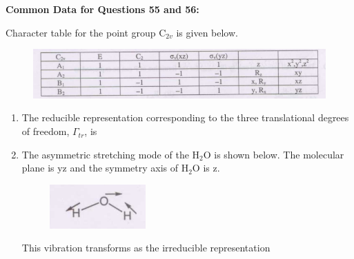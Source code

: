\documentclass[journal,12pt,onecolumn]{IEEEtran}
\theoremstyle{remark}
\begin{document}
\textbf{Common Data for Questions 55 and 56:}

Character table for the point group C$_{2v}$ is given below.
 \begin{figure}[H]
    \centering
    \includegraphics[width=0.8\columnwidth]{q55}
    \caption*{}
    \label{fig:q55}
\end{figure}

\begin{enumerate}[resume]
\item The reducible representation corresponding to the three translational degrees of freedom, $\Gamma_{tr}$, is
    \begin{enumerate}
        \hfill{}
    \end{enumerate}



\item The asymmetric stretching mode of the H$_2$O is shown below.
 The molecular plane is yz and the symmetry axis of H$_2$O is z.
 \begin{figure}[H]
        \centering
        \includegraphics[width=0.5\columnwidth]{q56}
        \caption*{}
        \label{fig:q56}
    \end{figure}
    This vibration transforms as the irreducible representation
    \begin{enumerate}
        \hfill{}
    \end{enumerate}
\end{enumerate}
\end{document}
